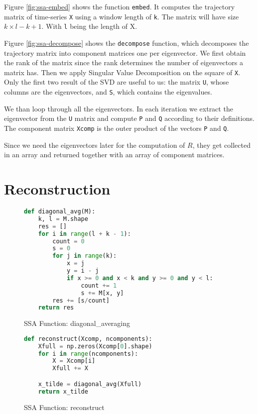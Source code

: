 Figure \ref{fig:ssa-embed} shows the function \texttt{embed}. It computes the trajectory matrix of time-series \texttt{X} using a window length of \texttt{k}. The matrix will have size $k \times l-k+1$. With \texttt{l} being the length of X. 

Figure \ref{fig:ssa-decompose} shows the \texttt{decompose} function, which decomposes the trajectory matrix into component matrices one per eigenvector.  We first obtain the rank of the matrix since the rank determines the number of eigenvectors a matrix has. Then we apply Singular Value Decomposition on the square of \texttt{X}. Only the first two result of the SVD are useful to us: the matrix \texttt{U}, whose columns are the eigenvectors, and \texttt{S}, which contains the eigenvalues. 

We than loop through all the eigenvectors. In each iteration we extract the eigenvector from the \texttt{U} matrix and compute \texttt{P} and \texttt{Q} according to their definitions. The component matrix \texttt{Xcomp} is the outer product of the vectors \texttt{P} and \texttt{Q}. 

Since we need the eigenvectors later for the computation of $R$, they get collected in an array and returned together with an array of component matrices. 

\section{Reconstruction}

\begin{figure}
\begin{singlespace}
\begin{lstlisting}[language=Python]
def diagonal_avg(M):
    k, l = M.shape
    res = []
    for i in range(l + k - 1):
        count = 0
        s = 0
        for j in range(k):
            x = j
            y = i - j
            if x >= 0 and x < k and y >= 0 and y < l:
                count += 1
                s += M[x, y]
        res += [s/count]
    return res
\end{lstlisting}
\end{singlespace}
\caption{SSA Function: diagonal\_averaging}    
\label{fig:ssa-diag-avg}
\end{figure}

\begin{figure}
\begin{singlespace}
\begin{lstlisting}[language=Python]
def reconstruct(Xcomp, ncomponents):
    Xfull = np.zeros(Xcomp[0].shape)
    for i in range(ncomponents):
        X = Xcomp[i]
        Xfull += X

    x_tilde = diagonal_avg(Xfull)
    return x_tilde
\end{lstlisting}
\end{singlespace}
\caption{SSA Function: reconstruct}    
\label{fig:ssa-reconstruct}
\end{figure}

